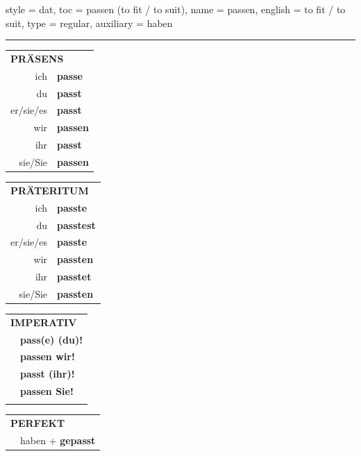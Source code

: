 \begin{verbentry}{
  style = {dat},
  toc = {passen (to fit / to suit)},
  name = {passen},
  english = {to fit / to suit},
  type = {regular},
  auxiliary = {haben}
}
 
    
     \vspace{5pt}

    \hrule
    
    \vspace{5pt}

  \begin{tabular}{rl}
     \multicolumn{2}{l}{\textbf{PRÄSENS} }\\
    ich & \textbf{passe}\\
    du & \textbf{passt}\\
    er/sie/es & \textbf{passt}\\
    wir & \textbf{passen}\\
    ihr & \textbf{passt}\\
    sie/Sie & \textbf{passen}\\
  \end{tabular}
  \hfill
     \begin{tabular}{rl}
    \multicolumn{2}{l}{\textbf{PRÄTERITUM} }\\
    ich & \textbf{passte}\\
    du & \textbf{passtest}\\
    er/sie/es & \textbf{passte}\\
    wir & \textbf{passten}\\
    ihr & \textbf{passtet}\\
    sie/Sie & \textbf{passten}\\
  \end{tabular}
  \hfill
  \begin{tabular}{rl}
     \multicolumn{2}{l}{\textbf{IMPERATIV} }\\
   & \textbf{pass(e) (du)!}\\
   & \textbf{passen wir!}\\
   & \textbf{passt (ihr)!}\\
   & \textbf{passen Sie!}\\
   & \vspace{10pt}
  \end{tabular}

    \vspace{10pt}

 \begin{tabular}{rl}
     \multicolumn{2}{l}{\textbf{PERFEKT}}\\
   & haben + \textbf{gepasst}\\
  \end{tabular}
\hfill
   \begin{tabular}{rl}
   

\end{tabular}
\end{verbentry}
